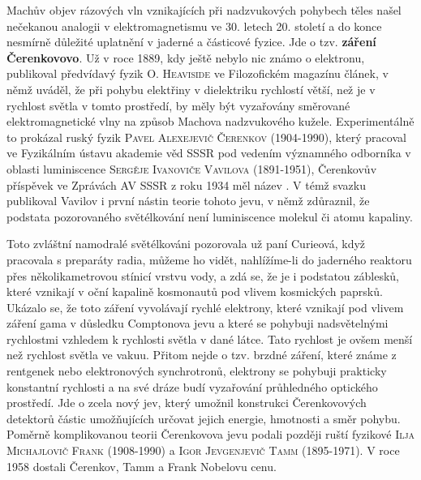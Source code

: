         Machův objev rázových vln vznikajících při nadzvukových pohybech těles našel nečekanou
        analogii v elektromagnetismu ve 30. letech 20. století a do konce nesmírně důležité
        uplatnění v jaderné a částicové fyzice. Jde o tzv. \textbf{záření Čerenkovovo}. Už v roce
        1889, kdy ještě nebylo nic známo o elektronu, publikoval předvídavý fyzik \textsc{O.
        Heaviside} ve Filozofickém magazínu článek, v němž uváděl, že při pohybu elektřiny v
        dielektriku rychlostí větší, než je v rychlost světla v tomto prostředí, by měly být
        vyzařovány směrované elektromagnetické vlny na způsob Machova nadzvukového kužele.
        Experimentálně to prokázal ruský fyzik \textsc{Pavel Alexejevič Čerenkov} (1904-1990), který
        pracoval ve Fyzikálním ústavu akademie věd SSSR pod vedením významného odborníka v oblasti
        luminiscence \textsc{Sergěje Ivanoviče Vavilova} (1891-1951), Čerenkovův příspěvek ve
        Zprávách AV SSSR z roku 1934 měl název \emph{}. V témž svazku publikoval Vavilov i první nástin teorie tohoto jevu, v
        němž zdůraznil, že podstata pozorovaného světélkování není luminiscence molekul či atomu
        kapaliny.

        Toto zvláštní namodralé světélkováni pozorovala už paní Curieová, když pracovala s preparáty
        radia, můžeme ho vidět, nahlížíme-li do jaderného reaktoru přes několikametrovou stínicí
        vrstvu vody, a zdá se, že je i podstatou záblesků, které vznikají v oční kapalině kosmonautů
        pod vlivem kosmických paprsků. Ukázalo se, že toto záření vyvolávají rychlé elektrony, které
        vznikají pod vlivem záření gama v důsledku Comptonova jevu a které se pohybuji nadsvětelnými
        rychlostmi vzhledem k rychlosti světla v dané látce. Tato rychlost je ovšem menší než
        rychlost světla ve vakuu. Přitom nejde o tzv. brzdné záření, které známe z rentgenek nebo
        elektronových synchrotronů, elektrony se pohybuji prakticky konstantní rychlosti a na své
        dráze budí vyzařování průhledného optického prostředí. Jde o zcela nový jev, který umožnil
        konstrukci Čerenkovových detektorů částic umožňujících určovat jejich energie, hmotnosti a
        směr pohybu. Poměrně komplikovanou teorii Čerenkovova jevu podali později ruští fyzikové
        \textsc{Ilja Michajlovič Frank} (1908-1990) a \textsc{Igor Jevgenjevič Tamm} (1895-1971). V
        roce 1958 dostali Čerenkov, Tamm a Frank Nobelovu cenu.

